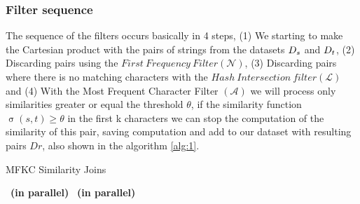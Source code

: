 
\subsubsection{Filter sequence}

The sequence of the filters occurs basically in 4 steps, (1) We starting to make the Cartesian product with the pairs of strings from the datasets ${D_s}{}$ and ${D_t}{}$, (2) Discarding pairs using the $First~Frequency~Filter(\mathcal{N})$, (3) Discarding pairs where there is no matching characters with the $Hash~Intersection~filter (\mathcal{L})$ and (4) With the Most Frequent Character Filter $(\mathcal{A})$ we will process only similarities greater or equal the threshold $\theta$, if the similarity function $\upsigma(s,t) \geq \theta$ in the first k characters we can stop the computation of the similarity of this pair, saving computation and add to our dataset with resulting pairs $Dr$, also shown in the algorithm \ref{alg:1}.


\begin{algorithm}[htb] 
	\caption{MFKC Similarity Joins}
	\label{alg:1}
	\begin{multicols}{2}
		\begin{algorithmic}[1]
            ~\textbf{(in parallel)}
			~\textbf{(in parallel)}
			
			\EndIf
			
			\EndIf
			\EndIf
			\EndIf
			\EndFor	
			\EndFor	
			\EndFor		
			\EndProcedure
		\end{algorithmic}
	\end{multicols}
\end{algorithm}

